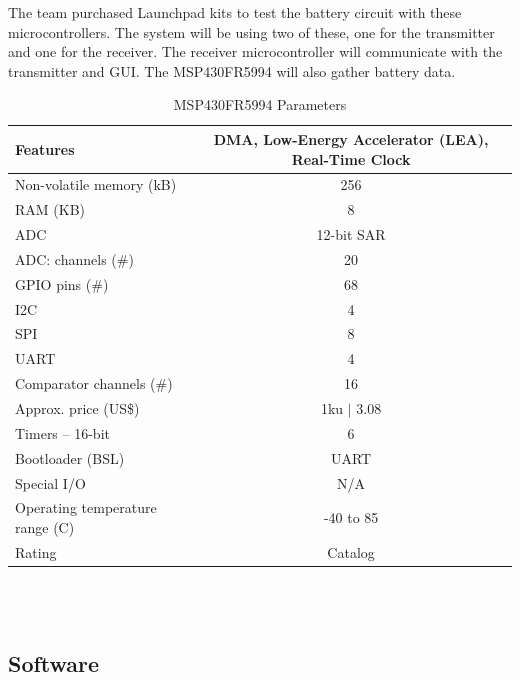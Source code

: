 \documentclass[12pt]{article}
\begin{document}
\indent
The team purchased Launchpad kits to test the battery circuit with these microcontrollers. The system will be using two of these, one for the transmitter and one for the receiver. The receiver microcontroller will communicate with the transmitter and GUI. The MSP430FR5994 will also gather battery data. \\
\hfill
\begin{table}[h!]
\centering
\caption{MSP430FR5994 Parameters \cite{MSP430FR599x}}
\begin{tabular}{| l | c |}
\hline
Features & \parbox{0.3\linewidth}{ 
DMA, Low-Energy Accelerator (LEA), Real-Time Clock
} \\
\hline
Non-volatile memory (kB) & 256\\
\hline
RAM (KB) & 8\\
\hline
ADC & 12-bit SAR\\
\hline
ADC: channels (\#) & 20\\
\hline
GPIO pins (\#) & 68\\
\hline
I2C & 4\\
\hline
SPI & 8\\
\hline
UART & 4\\
\hline
Comparator channels (\#) & 16\\
\hline
Approx. price (US\$) & 1ku $|$ 3.08\\
\hline
Timers – 16-bit & 6\\
\hline
Bootloader (BSL) & UART\\
\hline
Special I/O & N/A\\
\hline
Operating temperature range (C) & -40 to 85\\
\hline
Rating & Catalog\\
\hline
\end{tabular}
\end{table}
\hfill \\
\pagebreak
\hfill \\

\subsection{Software}
\end{document}
